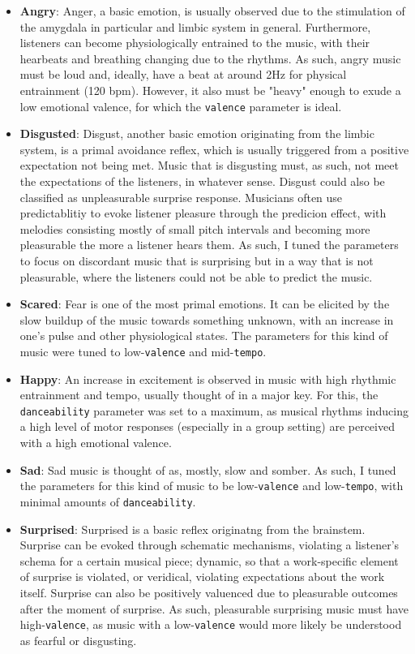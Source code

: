\documentclass{article}
\renewcommand{\_}[1]{\underline{ #1 }}
\theoremstyle{definition}
\begin{document}
\begin{itemize}
    \item \textbf{Angry}: Anger, a basic emotion, is usually observed due to the stimulation of the amygdala in particular and limbic system in general. Furthermore, listeners can become physiologically entrained to the music, with their hearbeats and breathing changing due to the rhythms. As such, angry music must be loud and, ideally, have a beat at around 2Hz for physical entrainment (120 bpm). However, it also must be "heavy" enough to exude a low emotional valence, for which the \texttt{valence} parameter is ideal.
    \item \textbf{Disgusted}: Disgust, another basic emotion originating from the limbic system, is a primal avoidance reflex, which is usually triggered from a positive expectation not being met. Music that is disgusting must, as such, not meet the expectations of the listeners, in whatever sense. Disgust could also be classified as unpleasurable surprise response. Musicians often use predictablitiy to evoke listener pleasure through the predicion effect, with melodies consisting mostly of small pitch intervals and becoming more pleasurable the more a listener hears them. As such, I tuned the parameters to focus on discordant music that is surprising but in a way that is not pleasurable, where the listeners could not be able to predict the music. 
    \item \textbf{Scared}: Fear is one of the most primal emotions. It can be elicited by the slow buildup of the music towards something unknown, with an increase in one's pulse and other physiological states. The parameters for this kind of music were tuned to low-\texttt{valence} and mid-\texttt{tempo}.
    \item \textbf{Happy}: An increase in excitement is observed in music with high rhythmic entrainment and tempo, usually thought of in a major key. For this, the \texttt{danceability} parameter was set to a maximum, as musical rhythms inducing a high level of motor responses (especially in a group setting) are perceived with a high emotional valence.
    \item \textbf{Sad}: Sad music is thought of as, mostly, slow and somber. As such, I tuned the parameters for this kind of music to be low-\texttt{valence} and low-\texttt{tempo}, with minimal amounts of \texttt{danceability}.
    \item \textbf{Surprised}: Surprised is a basic reflex originatng from the brainstem. Surprise can be evoked through schematic mechanisms, violating a listener's schema for a certain musical piece; dynamic, so that a work-specific element of surprise is violated, or veridical, violating expectations about the work itself. Surprise can also be positively valuenced due to pleasurable outcomes after the moment of surprise. As such, pleasurable surprising music must have high-\texttt{valence}, as music with a low-\texttt{valence} would more likely be understood as fearful or disgusting.

\end{itemize}
\end{document}
